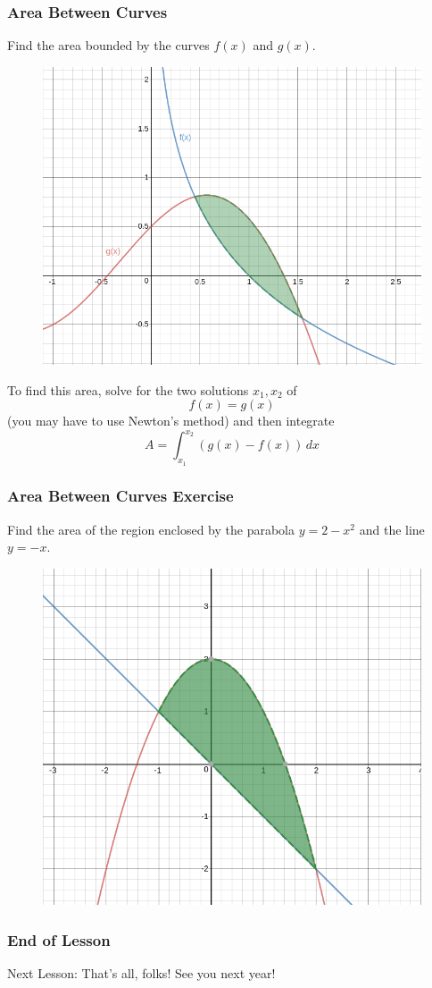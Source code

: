 \documentclass[xcolor=dvipsnames]{beamer}
\begin{document}
\begin{frame}
  \frametitle{Area Between Curves}
  {\ubung} Find the area bounded by the curves $f(x)$ and $g(x)$.
\begin{figure}[h]
\includegraphics[scale=.15]{./diagrams/areabetwcurs.png}
\end{figure}
To find this area, solve for the two solutions $x_{1},x_{2}$ of 
\begin{equation}
  \label{eq:aikooyae}
  f(x)=g(x)
\end{equation}
(you may have to use Newton's method) and then integrate
\begin{equation}
  \label{eq:upofahma}
  A=\int_{x_{1}}^{x_{2}}\left(g(x)-f(x)\right)\,dx
\end{equation}
\end{frame}

\begin{frame}
  \frametitle{Area Between Curves Exercise}
{\ubung} Find the area of the region enclosed by the parabola
$y=2-x^{2}$ and the line $y=-x$. 
\begin{figure}[h]
  \includegraphics[scale=0.2]{./diagrams/areabc.png}
\end{figure}
\end{frame}

\begin{frame}
  \frametitle{End of Lesson}
Next Lesson: That's all, folks! See you next year!
\end{frame}
\end{document}

